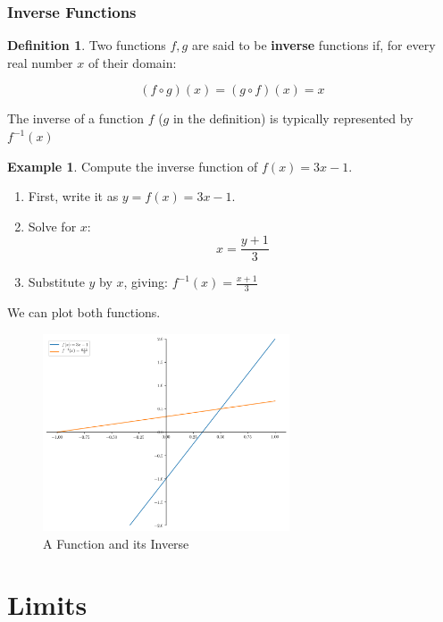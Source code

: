 \documentclass[a4paper,11pt]{article}
\theoremstyle{definition}
\newtheorem{definition}{Definition}
\newtheorem{example}{Example}
\theoremstyle{plain}
\begin{document}
\subsubsection{Inverse Functions}\label{inverse-functions}

\begin{definition} 
Two functions \(f, g\) are said to be
\textbf{inverse} functions if, for every real number \(x\) of their
domain:

\[
(f\circ g)(x) = (g \circ f)(x) = x
\]

The inverse of a function \(f\) (\(g\) in the definition) is typically
represented by \(f^{-1}(x)\)
\end{definition}

\begin{example} 
Compute the inverse function of \(f(x) = 3x -1\).

\begin{enumerate}
\def\labelenumi{\arabic{enumi}.}
\item
  First, write it as \(y = f(x) = 3x - 1\).
\item
  Solve for \(x\): \[
  x = \frac{y+1}{3}
  \]
\item
  Substitute \(y\) by \(x\), giving: \(f^{-1}(x) = \frac{x+1}{3}\)
\end{enumerate}

We can plot both functions.
\end{example}

    \begin{figure}[htbp]
    	\centering 
    		\includegraphics[width = 0.65\textwidth]{Ch1_files/Ch1_19_0.png}
    		\caption{A Function and its Inverse}
    		\label{fig:funct_inverse}
    \end{figure}
    
    \section{Limits}\label{limits}
\end{document}
